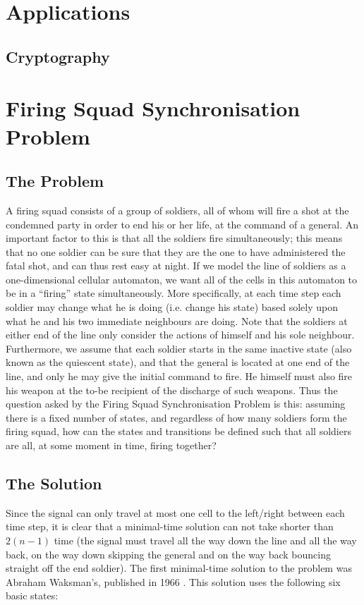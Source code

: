 \documentclass[11pt,a4paper]{article}
\begin{document}
\section{Applications}
    \subsection{Cryptography}

\section{Firing Squad Synchronisation Problem}
    \subsection{The Problem}
    A firing squad consists of a group of soldiers, all of whom will fire a shot
    at the condemned party in order to end his or her life, at the command of a
    general. An important factor to this is that all the soldiers fire
    simultaneously; this means that no one soldier can be sure that they are the
    one to have administered the fatal shot, and can thus rest easy at night. If
    we model the line of soldiers as a one-dimensional cellular automaton, we
    want all of the cells in this automaton to be in a ``firing'' state
    simultaneously.  More specifically, at each time step each soldier may
    change what he is doing (i.e. change his state) based solely upon what he
    and his two immediate neighbours are doing. Note that the soldiers at either
    end of the line only consider the actions of himself and his sole neighbour.
    Furthermore, we assume that each soldier starts in the same inactive state
    (also known as the quiescent state), and that the general is located at one
    end of the line, and only he may give the initial command to fire. He
    himself must also fire his weapon at the to-be recipient of the discharge of
    such weapons. Thus the question asked by the Firing Squad Synchronisation
    Problem is this: assuming there is a fixed number of states, and regardless
    of how many soldiers form the firing squad, how can the states and
    transitions be defined such that all soldiers are all, at some moment in
    time, firing together?

    \subsection{The Solution}
    Since the signal can only travel at most one cell to the left/right between
    each time step, it is clear that a minimal-time solution can not take shorter
    than $2(n-1)$ time (the signal must travel all the way down the line and all
    the way back, on the way down skipping the general and on the way back
    bouncing straight off the end soldier). The first minimal-time solution to
    the problem was Abraham Waksman's, published in 1966 \cite{Waksman}. This
    solution uses the following six basic states:
    
\end{document}
